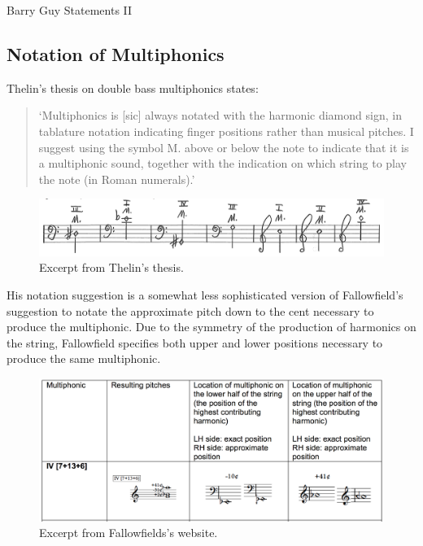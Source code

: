 Barry Guy Statements II

\subsection{Notation of Multiphonics}

Thelin's thesis on double bass multiphonics states:
\begin{quotation}
    `Multiphonics is [sic] always notated with the harmonic diamond sign, in tablature notation
indicating finger positions rather than musical pitches. I suggest using the symbol M. above or
below the note to indicate that it is a multiphonic sound, together with the indication on which
string to play the note (in Roman numerals).'\autocite[6]{thelinMultiphonicsDoubleBass2011}
\end{quotation}

\begin{figure}
    \includegraphics[width=\linewidth]{./resources/thelinMultiphonicNotation.png}
    \caption{Excerpt from Thelin's thesis.}
  \label{fig:Excerpt from Thelin's thesis}
  \end{figure}
His notation suggestion is a somewhat less sophisticated version of Fallowfield's suggestion to notate the approximate pitch down to the cent necessary to produce the multiphonic. 
Due to the symmetry of the production of harmonics on the string, Fallowfield specifies both upper and lower positions necessary to produce the same multiphonic.\autocite[index/the-string/multiphonics-and-other-multiple-sounds/fingeringcharts.html]{fallowfieldCelloMap}
\begin{figure}
    \includegraphics[width=\linewidth]{./resources/fallowfieldMultiphonicFingering.png}
    \caption{Excerpt from Fallowfields's website.}
\label{fig:Excerpt from Fallowfields's website}
  \end{figure}


